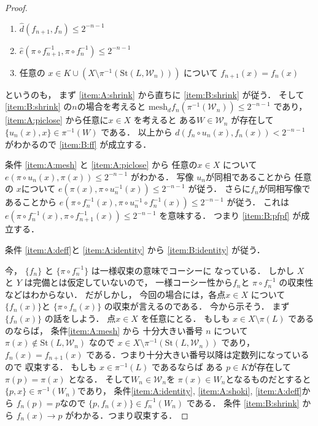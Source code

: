\documentclass[leqno, a4paper, 12pt]{jsarticle}
\numberwithin{equation}{section}
\newcommand{\yocovfont}[1]{\mathscr{#1}}
\newcommand{\yost}[1]{\mathrm{St}(#1)}
\newcommand{\yosupmet}[1]{\hat{#1}}
\newcommand{\yomesh}{\mathrm{mesh}}
\begin{document}
\begin{proof}
\begin{enumerate}[label=\textup{(B\arabic*)}]
\item\label{item:B:ff}
$\yosupmet{d}(f_{n+1}, f_{n})\le 2^{-n-1}$

\item\label{item:B:pfpf}
$\yosupmet{e}(\pi\circ f_{n+1}^{-1}, \pi\circ f_{n}^{-1})\le 2^{-n-1}$


\item\label{item:B:identity}
任意の
$x\in K\cup (X\setminus \pi^{-1}(\yost{L, \yocovfont{W}_{n}}))$
について
$f_{n+1}(x)=f_{n}(x)$



\end{enumerate}
というのも，
まず
\ref{item:A:shrink}
から直ちに
\ref{item:B:shrink}
が従う．
そして
\ref{item:B:shrink}
の$n$の場合を考えると
$\yomesh_{d}f_{n}(\pi^{-1}(\yocovfont{W}_{n}))\le 2^{-n-1}$
であり，
\ref{item:A:piclose}
から任意に$x\in X$
を考えると
ある$W\in \yocovfont{W}_{n}$
が存在して
$\{u_{n}(x), x\}\in \pi^{-1}(W)$
である．
以上から
$d(f_{n}\circ u_{n}(x), f_{n}(x))<2^{-n-1}$
がわかるので
\ref{item:B:ff}
が成立する．

条件
\ref{item:A:mesh}
と
\ref{item:A:piclose}
から
任意の$x\in X$
について
$e(\pi\circ u_{n}(x), \pi(x))\le 2^{-n-1}$
がわかる．
写像
$u_{n}$が同相であることから
任意の
$x$について
$e(\pi(x), \pi\circ u_{n}^{-1}(x))\le 2^{-n-1}$
が従う．
さらに$f_{n}$が同相写像であることから
$e(\pi\circ f_{n}^{-1}(x), \pi\circ u_{n}^{-1}\circ f_{n}^{-1}(x))\le 2^{-n-1}$
が従う．
これは
$e(\pi\circ f_{n}^{-1}(x), \pi\circ f_{n+1}^{-1}(x))\le 2^{-n-1}$
を意味する．
つまり
\ref{item:B:pfpf}
が成立する．


条件
\ref{item:A:deff}と
\ref{item:A:identity}
から
\ref{item:B:identity}
が従う．


今，
$\{f_{n}\}$
と
$\{\pi\circ f_{n}^{-1}\}$
は一様収束の意味でコーシーに
なっている．
しかし
$X$
と
$Y$
は完備とは仮定していないので，
一様コーシー性から$f_{n}$と
$\pi\circ f_{n}^{-1}$
の収束性などはわからない．
だがしかし，
今回の場合には，各点$x\in X$
について
$\{f_{n}(x)\}$と
$\{\pi\circ f_{n}(x)\}$
の収束が言えるのである．
今から示そう．
まず
$\{f_{n}(x)\}$
の話をしよう．
点$x\in X$
を任意にとる．
もしも
$x\in X\setminus \pi(L)$
であるのならば，
条件\ref{item:A:mesh}
から
十分大きい番号
$n$
について
$\pi(x)\not \in \yost{L, \yocovfont{W}_{n}}$
なので
$x\in X\setminus \pi^{-1}(\yost{L, \yocovfont{W}_{n}})$
であり，
$f_{n}(x)=f_{n+1}(x)$
である．つまり十分大きい番号以降は定数列になっているので
収束する．
もしも
$x\in \pi^{-1}(L)$
であるならば
ある
$p\in K$が存在して
$\pi(p)=\pi(x)$
となる．
そして$W_{n}\in \yocovfont{W}_{n}$を
$\pi(x)\in W_{n}$となるものだとすると
$\{p, x\}\in \pi^{-1}(W_{n})$であり，
条件\ref{item:A:identity}, 
\ref{item:A:shoki}, 
\ref{item:A:deff}から
$f_{n}(p)=p$なので
$\{p, f_{n}(x)\}\in f_{n}^{-1}(W_{n})$
である．
条件
\ref{item:B:shrink}
から
$f_{n}(x)\to p$
がわかる．つまり収束する．


\end{proof}
\end{document}
